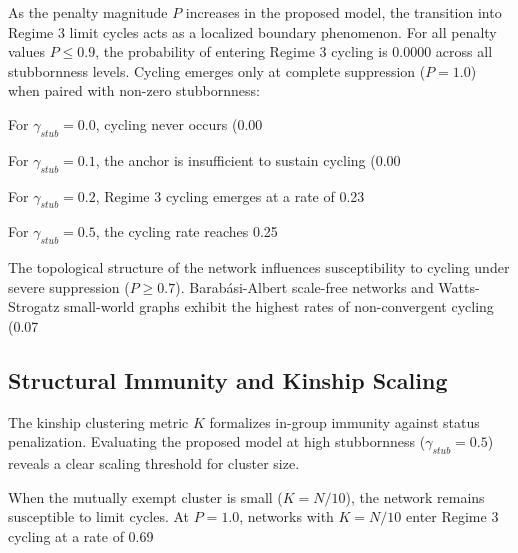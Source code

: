 As the penalty magnitude $P$ increases in the proposed model, the transition into Regime 3 limit cycles acts as a localized boundary phenomenon\cite{degroot1974reaching,acemoglu2013opinion}. For all penalty values $P \le 0.9$, the probability of entering Regime 3 cycling is 0.0000 across all stubbornness levels\cite{acemoglu2013opinion}. Cycling emerges only at complete suppression ($P = 1.0$) when paired with non-zero stubbornness\cite{degroot1974reaching,acemoglu2013opinion}:

For $\gamma_{stub} = 0.0$, cycling never occurs (0.00%

For $\gamma_{stub} = 0.1$, the anchor is insufficient to sustain cycling (0.00%

For $\gamma_{stub} = 0.2$, Regime 3 cycling emerges at a rate of 0.23%

For $\gamma_{stub} = 0.5$, the cycling rate reaches 0.25%

The topological structure of the network influences susceptibility to cycling under severe suppression ($P \ge 0.7$)\cite{degroot1974reaching,acemoglu2013opinion}. Barabási-Albert scale-free networks and Watts-Strogatz small-world graphs exhibit the highest rates of non-convergent cycling (0.07%

\subsection{Structural Immunity and Kinship Scaling}
The kinship clustering metric $K$ formalizes in-group immunity against status penalization\cite{degroot1974reaching}. Evaluating the proposed model at high stubbornness ($\gamma_{stub} = 0.5$) reveals a clear scaling threshold for cluster size\cite{degroot1974reaching,acemoglu2013opinion}.

When the mutually exempt cluster is small ($K = N/10$), the network remains susceptible to limit cycles\cite{degroot1974reaching,acemoglu2013opinion}. At $P = 1.0$, networks with $K = N/10$ enter Regime 3 cycling at a rate of 0.69%

